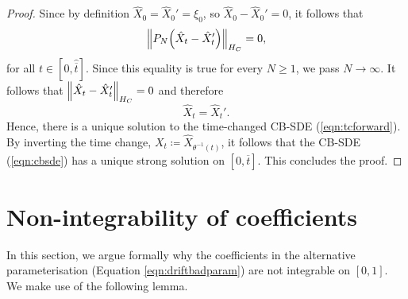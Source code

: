 \begin{proof}
  Since by definition \(\hat{X}_{0} = \hat{X}_{0}' = \xi_{0}\), so \(\hat{X}_{0} - \hat{X}_{0}' = 0\), it follows that
  \[
    \norm{P_{N}\qty(\hat{X}_{t} - \hat{X}_{t}')}_{H_{C}} = 0,
  \]
  for all \(t \in [0, \hat{\overline{t}}]\). Since this equality is true for every \(N \geq 1\), we pass \(N \to \infty\). It follows that \(\norm{ \hat{X}_{t} - \hat{X}_{t}'}_{H_{C}} = 0\) and therefore
  \[
    \hat{X}_{t} = \hat{X}_{t}'.
  \]
  Hence, there is a unique solution to the time-changed CB-SDE (\ref{eqn:tcforward}). By inverting the time change, \(X_{t} \coloneqq \hat{X}_{\theta^{-1}(t)}\), it follows that the CB-SDE (\ref{eqn:cbsde}) has a unique strong solution on \([0, \overline{t}]\). This concludes the proof.
\end{proof}

\section{Non-integrability of coefficients}\label{sec:nonintegrable}

In this section, we argue formally why the coefficients in the alternative parameterisation (Equation \ref{eqn:driftbadparam}) are not integrable on \([0,1]\). We make use of the following lemma.

